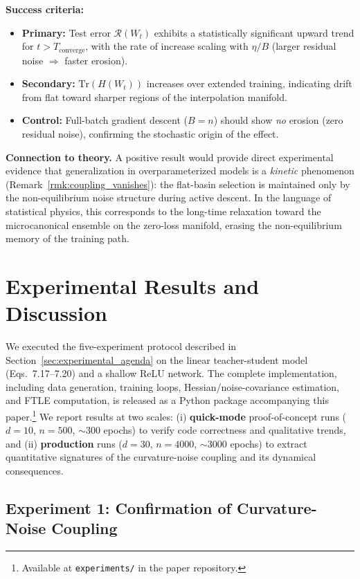 \documentclass[
  journal=largetwo,
  simfonts=false,
  year=2025,
  volume=37,
]{cup-journal}
\begin{document}
\textbf{Success criteria:}
\begin{itemize}
    \item \textbf{Primary:} Test error $\mathcal{R}(W_t)$ exhibits a statistically significant upward trend for $t > T_{\mathrm{converge}}$, with the rate of increase scaling with $\eta / B$ (larger residual noise $\Rightarrow$ faster erosion).
    \item \textbf{Secondary:} $\mathrm{Tr}(H(W_t))$ increases over extended training, indicating drift from flat toward sharper regions of the interpolation manifold.
    \item \textbf{Control:} Full-batch gradient descent ($B = n$) should show \emph{no} erosion (zero residual noise), confirming the stochastic origin of the effect.
\end{itemize}

\textbf{Connection to theory.}
A positive result would provide direct experimental evidence that generalization in overparameterized models is a \emph{kinetic} phenomenon (Remark~\ref{rmk:coupling_vanishes}): the flat-basin selection is maintained only by the non-equilibrium noise structure during active descent. In the language of statistical physics, this corresponds to the long-time relaxation toward the microcanonical ensemble on the zero-loss manifold, erasing the non-equilibrium memory of the training path.

\newpage
\section{Experimental Results and Discussion}\label{sec:results}

We executed the five-experiment protocol described in Section~\ref{sec:experimental_agenda} on the linear teacher-student model (Eqs.\ 7.17--7.20) and a shallow ReLU network. The complete implementation, including data generation, training loops, Hessian/noise-covariance estimation, and FTLE computation, is released as a Python package accompanying this paper.\footnote{Available at \texttt{experiments/} in the paper repository.} We report results at two scales: (i) \textbf{quick-mode} proof-of-concept runs ($d=10$, $n=500$, $\sim$300 epochs) to verify code correctness and qualitative trends, and (ii) \textbf{production} runs ($d=30$, $n=4000$, $\sim$3000 epochs) to extract quantitative signatures of the curvature-noise coupling and its dynamical consequences.

\subsection{Experiment 1: Confirmation of Curvature-Noise Coupling}
\end{document}
